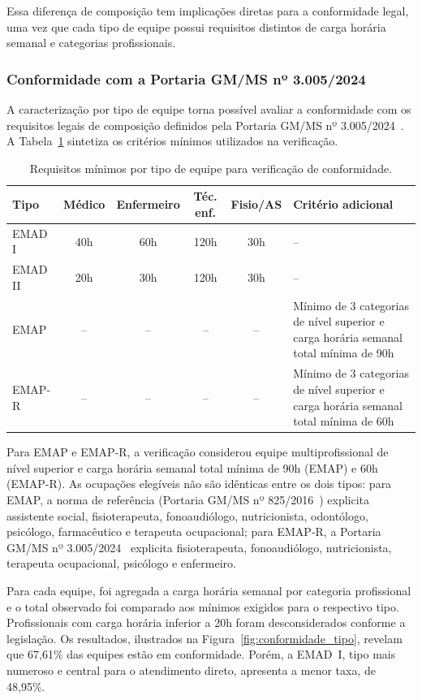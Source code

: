 \documentclass[12pt]{article}
\DeclareRobustCommand{\citelink}[2]{#2~\cite{#1}}
\begin{document}
Essa diferença de composição tem implicações diretas para a conformidade legal, uma vez que cada tipo de equipe possui requisitos distintos de carga horária semanal e categorias profissionais.

\subsubsection{Conformidade com a Portaria GM/MS nº 3.005/2024}

A caracterização por tipo de equipe torna possível avaliar a conformidade com os requisitos legais de composição definidos pela \citelink{portaria3005}{Portaria GM/MS nº 3.005/2024}. A Tabela~\ref{tab:requisitos_conformidade} sintetiza os critérios mínimos utilizados na verificação.

\begin{table}[H]
\centering
\caption{Requisitos mínimos por tipo de equipe para verificação de conformidade.}
\label{tab:requisitos_conformidade}
\begin{tabular}{|l|c|c|c|c|p{5.3cm}|}
\hline
\textbf{Tipo} & \textbf{Médico} & \textbf{Enfermeiro} & \textbf{Téc. enf.} & \textbf{Fisio/AS} & \textbf{Critério adicional} \\
\hline
EMAD I & 40h & 60h & 120h & 30h & -- \\
EMAD II & 20h & 30h & 120h & 30h & -- \\
EMAP & -- & -- & -- & -- & Mínimo de 3 categorias de nível superior e carga horária semanal total mínima de 90h \\
EMAP-R & -- & -- & -- & -- & Mínimo de 3 categorias de nível superior e carga horária semanal total mínima de 60h \\
\hline
\end{tabular}
\end{table}

Para EMAP e EMAP-R, a verificação considerou equipe multiprofissional de nível superior e carga horária semanal total mínima de 90h (EMAP) e 60h (EMAP-R). As ocupações elegíveis não são idênticas entre os dois tipos: para EMAP, a norma de referência (\citelink{portaria825}{Portaria GM/MS nº 825/2016}) explicita assistente social, fisioterapeuta, fonoaudiólogo, nutricionista, odontólogo, psicólogo, farmacêutico e terapeuta ocupacional; para EMAP-R, a \citelink{portaria3005}{Portaria GM/MS nº 3.005/2024} explicita fisioterapeuta, fonoaudiólogo, nutricionista, terapeuta ocupacional, psicólogo e enfermeiro.

Para cada equipe, foi agregada a carga horária semanal por categoria profissional e o total observado foi comparado aos mínimos exigidos para o respectivo tipo. Profissionais com carga horária inferior a 20h foram desconsiderados conforme a legislação. Os resultados, ilustrados na Figura~\ref{fig:conformidade_tipo}, revelam que 67,61\% das equipes estão em conformidade. Porém, a EMAD~I, tipo mais numeroso e central para o atendimento direto, apresenta a menor taxa, de 48,95\%.
\end{document}
